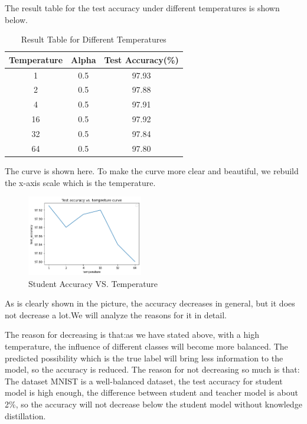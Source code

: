 \documentclass[conference]{IEEEtran}
\begin{document}
  The result table for the test accuracy under different temperatures is shown below.
  \begin{table}[h]
      \centering
      \begin{tabular}{|c|c|c|}
      \hline
      Temperature & Alpha & Test Accuracy(\%)      \\ \hline
      1           & 0.5   & 97.93   \\ \hline
      2           & 0.5   & 97.88 \\ \hline
      4           & 0.5   & 97.91 \\ \hline
      16          & 0.5   & 97.92  \\ \hline
      32          & 0.5   & 97.84 \\ \hline
      64          & 0.5   & 97.80 \\ \hline
      \end{tabular}
      \caption{Result Table for Different Temperatures}
  \end{table}\par
  The curve is shown here. To make the curve more clear and beautiful, we rebuild the x-axis scale which is the temperature.
  \begin{figure}[h] 
      \centering
      \includegraphics[width=0.45\textwidth]{./graphs/accuracy_vs_temperature.png}
      \caption{Student Accuracy VS. Temperature}
      \label{Fig.t1q3e}
  \end{figure}
  As is clearly shown in the picture, the accuracy decreases in general, but it does not decrease a lot.We will analyze the reasons for it in detail.\par
  The reason for decreasing is that:as we have stated above, with a high temperature, the influence of different classes will become more balanced. The predicted possibility which is the true label will bring less information to the model, so the accuracy is reduced.
  The reason for not decreasing so much is that: The dataset MNIST is a well-balanced dataset, the test accuracy for student model is high enough, the difference between student and teacher model is about 2\%, so the accuracy will not decrease below the student model without knowledge distillation.
\end{document}

